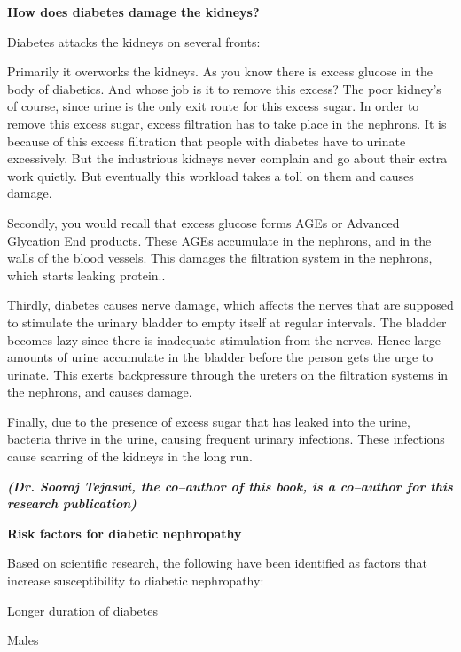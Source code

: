 \textbf{How does diabetes damage the kidneys?}

Diabetes attacks the kidneys on several fronts:

\item Primarily it overworks the kidneys. As you know there is excess glucose in the body of diabetics. And whose job is it to remove this excess? The poor kidney’s of course, since urine is the only exit route for this excess sugar. In order to remove this excess sugar, excess filtration has to take place in the nephrons. It is because of this excess filtration that people with diabetes have to urinate excessively. But the industrious kidneys never complain and go about their extra work quietly. But eventually this workload takes a toll on them and causes damage.

 \item Secondly, you would recall that excess glucose forms AGEs or Advanced Glycation End products. These AGEs accumulate in the nephrons, and in the walls of the blood vessels. This damages the filtration system in the nephrons, which starts leaking protein..

 \item Thirdly, diabetes causes nerve damage, which affects the nerves that are supposed to stimulate the urinary bladder to empty itself at regular intervals. The bladder becomes lazy since there is inadequate stimulation from the nerves. Hence large amounts of urine accumulate in the bladder before the person gets the urge to urinate. This exerts backpressure through the ureters on the filtration systems in the nephrons, and causes damage.

 \item 
 Finally, due to the presence of excess sugar that has leaked into the urine, bacteria thrive in the urine, causing frequent urinary infections. These infections cause scarring of the kidneys in the long run.\supskpt{\footnote{}}

 \textbf{\textit{(Dr. Sooraj Tejaswi, the co–author of this book, is a co–author for this research publication)}}


\textbf{Risk factors for diabetic nephropathy}

Based on scientific research, the following have been identified as factors that increase susceptibility to diabetic nephropathy:

\item Longer duration of diabetes

 \item Males

